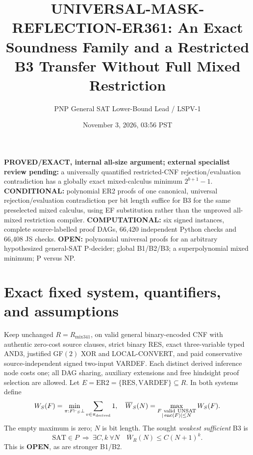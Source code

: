 \documentclass[11pt]{article}
\title{UNIVERSAL-MASK-REFLECTION-ER361: An Exact Soundness Family and a Restricted B3 Transfer Without Full Mixed Restriction}
\author{PNP General SAT Lower-Bound Lead / LSPV-1}
\date{November 3, 2026, 03:56 PST}
\begin{document}
\maketitle
\noindent\textbf{PROVED/EXACT, internal all-size argument; external specialist review pending:} a universally quantified restricted-CNF rejection/evaluation contradiction has a globally exact mixed-calculus minimum $2^{b+1}-1$. \textbf{CONDITIONAL:} polynomial ER2 proofs of one canonical, universal rejection/evaluation contradiction per bit length suffice for B3 for the same preselected mixed calculus, using EF substitution rather than the unproved all-mixed restriction compiler. \textbf{COMPUTATIONAL:} six signed instances, complete source-labelled proof DAGs, 66,420 independent Python checks and 66,408 JS checks. \textbf{OPEN:} polynomial universal proofs for an arbitrary hypothesized general-SAT P-decider; global B1/B2/B3; a superpolynomial mixed minimum; P versus NP.

\section*{Exact fixed system, quantifiers, and assumptions}
Keep unchanged $R=R_{\mathrm{mix341}}$, on valid general binary-encoded CNF with authentic zero-cost source clauses, strict binary RES, exact three-variable typed AND3, justified GF$(2)$ XOR and LOCAL-CONVERT, and paid conservative source-independent signed two-input VARDEF. Each distinct derived inference node costs one; all DAG sharing, auxiliary extensions and free hindsight proof selection are allowed. Let $E=\mathrm{ER2}=\{\mathrm{RES},\mathrm{VARDEF}\}\subseteq R$. In both systems define
\[
 W_S(F)=\min_{\pi:F\vdash_S\bot}\sum_{v\in\pi_{\rm derived}}1,\quad
 \overline W_S(N)=\max_{\substack{F\ {\rm valid\ UNSAT}\\|\operatorname{enc}(F)|\le N}}W_S(F).
\]
The empty maximum is zero; $N$ is bit length. The sought \emph{weakest sufficient} B3 is
\[
  \mathrm{SAT}\in P\ \Longrightarrow\
  \exists C,k\ \forall N\quad \overline W_R(N)\le C(N+1)^k.
\]
This is \textbf{OPEN}, as are stronger B1/B2.
\end{document}
